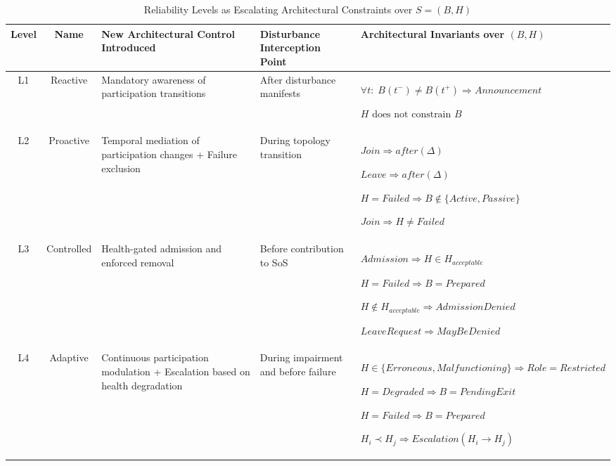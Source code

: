 \begin{table}[h]
\centering
\caption{Reliability Levels as Escalating Architectural Constraints over $S = (B,H)$}
\begin{tabular}{|c|c|p{3cm}|p{3.2cm}|p{5.4cm}|}
\hline
\textbf{Level} &
\textbf{Name} &
\textbf{New Architectural Control Introduced} &
\textbf{Disturbance Interception Point} &
\textbf{Architectural Invariants over $(B,H)$} \\
\hline

L1 &
Reactive &
Mandatory awareness of participation transitions &
After disturbance manifests &
\(
\forall t:\; B(t^-)\neq B(t^+) \Rightarrow Announcement
\)

\(
H\text{ does not constrain }B
\)

\\
\hline

L2 &
Proactive &
Temporal mediation of participation changes +
Failure exclusion &
During topology transition &
\(
Join \Rightarrow after(\Delta)
\)

\(
Leave \Rightarrow after(\Delta)
\)

\(
H = Failed \Rightarrow B \notin \{Active, Passive\}
\)

\(
Join \Rightarrow H \neq Failed
\)

\\
\hline

L3 &
Controlled &
Health-gated admission and enforced removal &
Before contribution to SoS &
\(
Admission \Rightarrow H \in H_{acceptable}
\)

\(
H = Failed \Rightarrow B = Prepared
\)

\(
H \notin H_{acceptable} \Rightarrow AdmissionDenied
\)

\(
LeaveRequest \Rightarrow MayBeDenied
\)

\\
\hline

L4 &
Adaptive &
Continuous participation modulation +
Escalation based on health degradation &
During impairment and before failure &
\(
H \in \{Erroneous, Malfunctioning\} \Rightarrow Role = Restricted
\)

\(
H = Degraded \Rightarrow B = PendingExit
\)

\(
H = Failed \Rightarrow B = Prepared
\)

\(
H_i \prec H_j \Rightarrow Escalation(H_i \rightarrow H_j)
\)

\\
\hline

\end{tabular}
\end{table}